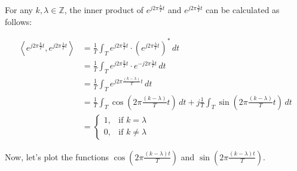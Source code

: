 \begin{derivation}
    For any $k, \lambda \in \mathbb{Z}$, the inner product of $e^{j 2\pi \frac{k}{T} t}$ and $e^{j 2\pi \frac{\lambda}{T} t}$ can be calculated as follows:

    \begin{align*}
        \left\langle e^{j 2\pi \frac{k}{T} t}, e^{j 2\pi \frac{\lambda}{T} t} \right\rangle &= \frac{1}{T} \int_T e^{j 2\pi \frac{k}{T} t} \cdot \left(e^{j 2\pi \frac{\lambda}{T} t}\right)^* \, dt \\
        &= \frac{1}{T} \int_T e^{j 2\pi \frac{k}{T} t} \cdot e^{-j 2\pi \frac{\lambda}{T} t} \, dt \\
        &= \frac{1}{T} \int_T e^{j 2\pi \frac{(k-\lambda)}{T} t} \, dt \\
        &= \frac{1}{T} \int_T \cos\left(2\pi \frac{(k-\lambda)}{T} t\right) \, dt + j \frac{1}{T} \int_T \sin\left(2\pi \frac{(k-\lambda)}{T} t\right) \, dt \\
        &= 
        \begin{cases}
            1, & \text{if } k = \lambda \\
            0, & \text{if } k \neq \lambda
        \end{cases}
    \end{align*}

    \bigskip

    Now, let's plot the functions $\cos\left(2\pi \frac{(k-\lambda)t}{T}\right)$ and $\sin\left(2\pi \frac{(k-\lambda)t}{T}\right)$.

    \begin{center}
    \end{center}


\end{derivation}
